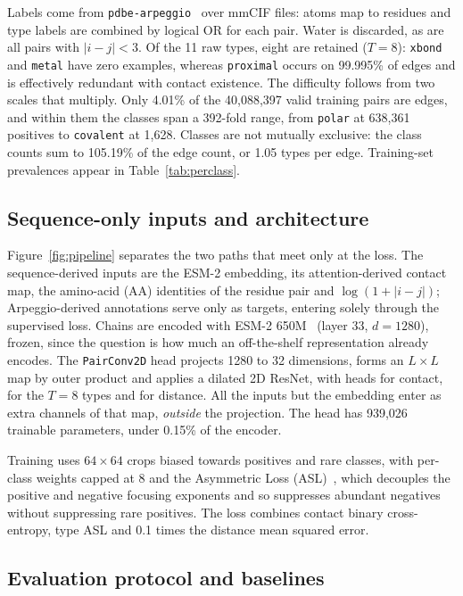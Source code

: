 \documentclass[12pt]{article}
\begin{document}
Labels come from \texttt{pdbe-arpeggio}~\cite{jubb2017arpeggio} over mmCIF files: atoms
map to residues and type labels are combined by logical OR for each pair. Water is
discarded, as are all pairs with $|i-j|<3$. Of the 11 raw types, eight are retained
($T=8$): \texttt{xbond} and \texttt{metal} have zero examples, whereas
\texttt{proximal} occurs on 99.995\% of edges and is effectively redundant with contact
existence. The difficulty follows from two scales that multiply. Only 4.01\% of the 40,088,397
valid training pairs are edges, and within them the classes span a
392-fold range, from \texttt{polar} at 638,361 positives to \texttt{covalent} at 1,628.
Classes are not mutually exclusive: the class counts sum to 105.19\% of the edge count,
or 1.05 types per edge. Training-set prevalences appear in
Table~\ref{tab:perclass}.

\subsection{Sequence-only inputs and architecture}
\label{sec:model}


Figure~\ref{fig:pipeline} separates the two paths that meet only at the loss. The
sequence-derived inputs are the ESM-2 embedding, its attention-derived contact map, the
amino-acid (AA) identities of the residue pair and $\log(1+|i-j|)$; Arpeggio-derived
annotations serve only as targets, entering solely through the supervised loss.
Chains are encoded with ESM-2 650M~\cite{lin2023esm2} (layer 33, $d=1280$), frozen,
since the question is how much an off-the-shelf representation already encodes. The
\texttt{PairConv2D} head projects 1280 to 32 dimensions, forms an $L{\times}L$ map by
outer product and applies a dilated 2D ResNet, with heads for contact, for the $T=8$
types and for distance. All the inputs but the embedding enter as extra channels of
that map, \emph{outside} the projection. The head has 939,026 trainable parameters, under 0.15\% of the encoder.

Training uses $64{\times}64$ crops biased towards positives and rare classes, with
per-class weights capped at 8 and the Asymmetric Loss
(ASL)~\cite{ridnik2021asl}, which decouples the positive and negative focusing
exponents and so suppresses abundant negatives without suppressing rare positives. The
loss combines contact binary cross-entropy, type ASL and 0.1 times the distance mean
squared error.

\subsection{Evaluation protocol and baselines}
\label{sec:eval}
\end{document}
